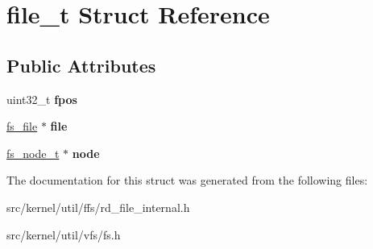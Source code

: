 \hypertarget{structfile__t}{}\section{file\+\_\+t Struct Reference}
\label{structfile__t}
\subsection*{Public Attributes}
\begin{DoxyCompactItemize}
\item 
\mbox{\label{structfile__t_a73e9e0739da2ba7e6a496b1cc108a1c1}} 
uint32\+\_\+t {\bfseries fpos}
\item 
\mbox{\label{structfile__t_a45b40ff8bb9320cc68a79eff19f42938}} 
\hyperlink{structfs__file}{fs\+\_\+file} $\ast$ {\bfseries file}
\item 
\mbox{\label{structfile__t_a80adbc2028726c6c06f05bd467d202b8}} 
\hyperlink{structfs__node}{fs\+\_\+node\+\_\+t} $\ast$ {\bfseries node}
\end{DoxyCompactItemize}


The documentation for this struct was generated from the following files\+:\begin{DoxyCompactItemize}
\item 
src/kernel/util/ffs/rd\+\_\+file\+\_\+internal.\+h\item 
src/kernel/util/vfs/fs.\+h\end{DoxyCompactItemize}

